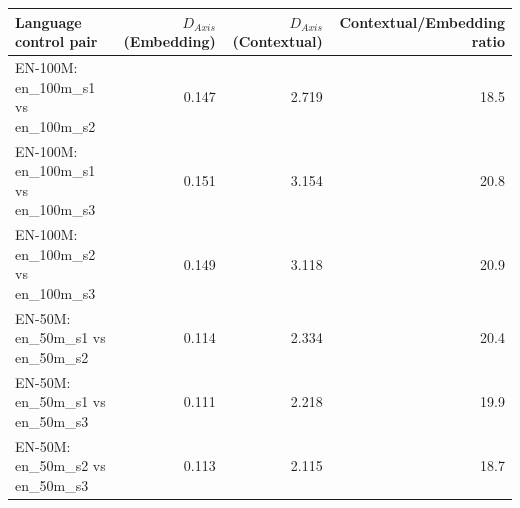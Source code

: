 \begin{tabular}{@{}lrrr@{}}
\toprule
Language control pair & $D_{Axis}$ (Embedding) & $D_{Axis}$ (Contextual) & Contextual/Embedding ratio \\
\midrule
EN-100M: en\_100m\_s1 vs en\_100m\_s2 & 0.147 & 2.719 & 18.5 \\
EN-100M: en\_100m\_s1 vs en\_100m\_s3 & 0.151 & 3.154 & 20.8 \\
EN-100M: en\_100m\_s2 vs en\_100m\_s3 & 0.149 & 3.118 & 20.9 \\
EN-50M: en\_50m\_s1 vs en\_50m\_s2 & 0.114 & 2.334 & 20.4 \\
EN-50M: en\_50m\_s1 vs en\_50m\_s3 & 0.111 & 2.218 & 19.9 \\
EN-50M: en\_50m\_s2 vs en\_50m\_s3 & 0.113 & 2.115 & 18.7 \\
\bottomrule
\end{tabular}
